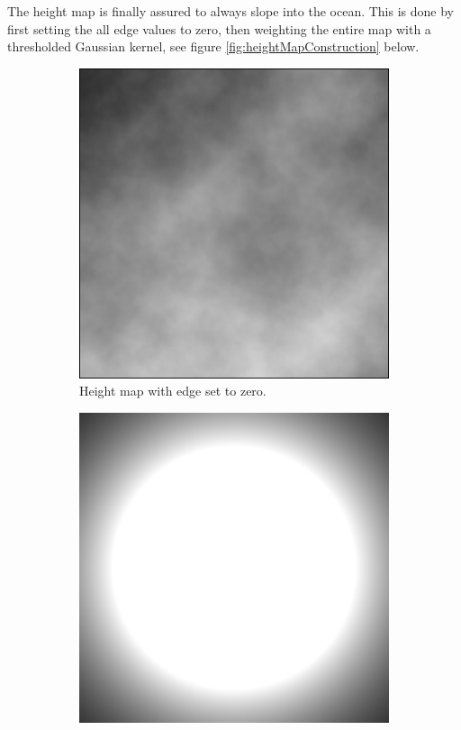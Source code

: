 The height map is finally assured to always slope into the ocean. This is done by first setting the all edge values to zero, then weighting the entire map with a thresholded Gaussian kernel, see figure \ref{fig:heightMapConstruction} below. 

\begin{figure}[H]
\begin{subfigure}{\textwidth/3}
  \centering
  \includegraphics[width=0.9\linewidth]{images/heightMapRaw.jpg}
  \caption{Height map with edge set to zero.}
  \label{fig:heightMapRaw}
\end{subfigure}%
\begin{subfigure}{\textwidth/3}
  \centering
  \includegraphics[width=0.9\linewidth]{images/heightMapKernel.jpg}

\end{subfigure}
\end{figure}
